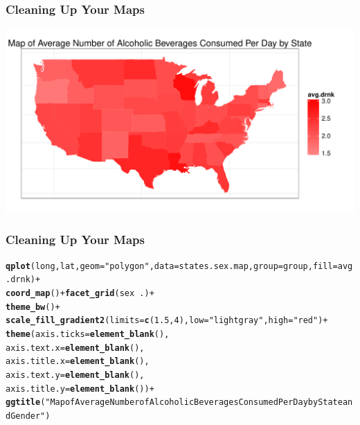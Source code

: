 \documentclass{beamer}\usepackage[]{graphicx}\usepackage[]{color}
\makeatletter
\newcommand{\hlnum}[1]{\textcolor[rgb]{0.686,0.059,0.569}{#1}}%
\newcommand{\hlstr}[1]{\textcolor[rgb]{0.192,0.494,0.8}{#1}}%
\newcommand{\hlopt}[1]{\textcolor[rgb]{0,0,0}{#1}}%
\newcommand{\hlstd}[1]{\textcolor[rgb]{0.345,0.345,0.345}{#1}}%
\newcommand{\hlkwc}[1]{\textcolor[rgb]{0.333,0.667,0.333}{#1}}%
\newcommand{\hlkwd}[1]{\textcolor[rgb]{0.737,0.353,0.396}{\textbf{#1}}}%
\newenvironment{kframe}{%
 \def\at@end@of@kframe{}%
 \ifinner\ifhmode%
  \def\at@end@of@kframe{\end{minipage}}%
  \begin{minipage}{\columnwidth}%
 \fi\fi%
 \def\FrameCommand##1{\hskip\@totalleftmargin \hskip-\fboxsep
 \colorbox{shadecolor}{##1}\hskip-\fboxsep
     \hskip-\linewidth \hskip-\@totalleftmargin \hskip\columnwidth}%
 \MakeFramed {\advance\hsize-\width
   \@totalleftmargin\z@ \linewidth\hsize
   \@setminipage}}%
 {\par\unskip\endMakeFramed%
 \at@end@of@kframe}
\newenvironment{knitrout}{}{} %
\makeatother
\begin{document}

\begin{frame}[fragile]
    \frametitle{Cleaning Up Your Maps}

\begin{knitrout}\footnotesize
{}\color{fgcolor}
\includegraphics[width=\textwidth]{figure/kalcohol3} 

\end{knitrout}
\end{frame}



\begin{frame}[fragile]
    \frametitle{Cleaning Up Your Maps}

\begin{knitrout}\footnotesize
{}\color{fgcolor}\begin{kframe}
\begin{alltt}
\hlkwd{qplot}\hlstd{(long, lat,} \hlkwc{geom}\hlstd{=}\hlstr{"polygon"}\hlstd{,} \hlkwc{data}\hlstd{=states.sex.map,} \hlkwc{group}\hlstd{=group,} \hlkwc{fill}\hlstd{=avg.drnk)} \hlopt{+}
  \hlkwd{coord_map}\hlstd{()} \hlopt{+} \hlkwd{facet_grid}\hlstd{(sex} \hlopt{~} \hlstd{.)} \hlopt{+}
  \hlkwd{theme_bw}\hlstd{()} \hlopt{+}
  \hlkwd{scale_fill_gradient2}\hlstd{(}\hlkwc{limits}\hlstd{=}\hlkwd{c}\hlstd{(}\hlnum{1.5}\hlstd{,} \hlnum{4}\hlstd{),}\hlkwc{low}\hlstd{=}\hlstr{"lightgray"}\hlstd{,}\hlkwc{high}\hlstd{=}\hlstr{"red"}\hlstd{)} \hlopt{+}
  \hlkwd{theme}\hlstd{(}\hlkwc{axis.ticks} \hlstd{=} \hlkwd{element_blank}\hlstd{(),}
       \hlkwc{axis.text.x} \hlstd{=} \hlkwd{element_blank}\hlstd{(),}
       \hlkwc{axis.title.x}\hlstd{=}\hlkwd{element_blank}\hlstd{(),}
       \hlkwc{axis.text.y} \hlstd{=} \hlkwd{element_blank}\hlstd{(),}
       \hlkwc{axis.title.y}\hlstd{=}\hlkwd{element_blank}\hlstd{())} \hlopt{+}
  \hlkwd{ggtitle}\hlstd{(}\hlstr{"Map of Average Number of Alcoholic Beverages Consumed Per Day by State and Gender"}\hlstd{)}
\end{alltt}
\end{kframe}
\end{knitrout}
\end{frame}
 
\end{document}
